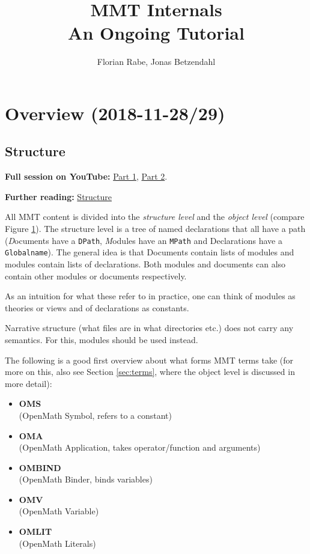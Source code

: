\documentclass[11pt,a4paper]{article}
\author{Florian Rabe, Jonas Betzendahl}
\title{MMT Internals\\ An Ongoing Tutorial}
\newcommand{\MMT}{\textsf{MMT}\xspace}
\begin{document}
\maketitle
{\hypersetup{hidelinks}\tableofcontents}
\bigskip

\section{Overview (2018-11-28/29)}
\label{sec:overview}

\subsection{Structure}

\textbf{Full session on YouTube:} \href{https://www.youtube.com/watch?v=PUKjQbbeqdQ}{Part 1}, \href{https://www.youtube.com/watch?v=yh_vwVm8Szc}{Part 2}.
\medskip

\textbf{Further reading:} \href{https://uniformal.github.io/doc/language/}{Structure}
\bigskip

All \MMT content is divided into the \emph{structure level} and the \emph{object level} (compare Figure \ref{fig:mmtcontent}). The structure level is a tree of named declarations that all have a path (\emph{D}ocuments have a \texttt{DPath}, \emph{M}odules have an \texttt{MPath} and Declarations have a \texttt{Globalname}). The general idea is that Documents contain lists of modules and modules contain lists of declarations. Both modules and documents can also contain  other modules or documents respectively.

As an intuition for what these refer to in practice, one can think of modules as theories or views and of declarations as constants.

\begin{figure}[h]
\centering
\label{fig:mmtcontent}
\end{figure}

Narrative structure (what files are in what directories etc.) does not carry any semantics. For this, modules should be used instead.

The following is a good first overview about what forms \MMT terms take (for more on this, also see Section \ref{sec:terms}, where the object level is discussed in more detail):

\begin{itemize}
\item \textbf{OMS}\\ (OpenMath Symbol, refers to a constant)
\item \textbf{OMA}\\ (OpenMath Application, takes operator/function and arguments)
\item \textbf{OMBIND}\\ (OpenMath Binder, binds variables)
\item \textbf{OMV}\\ (OpenMath Variable)
\item \textbf{OMLIT}\\ (OpenMath Literals)
\end{itemize}
\end{document}
